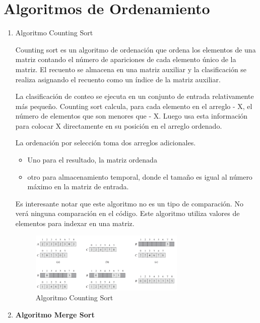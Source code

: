 \documentclass{article}
\begin{document}
	\section{Algoritmos de Ordenamiento}\label{sec:ejercicios}
	\begin{enumerate}
		\item Algoritmo Counting Sort
		
			Counting sort es un algoritmo de ordenación que ordena los elementos de una matriz contando el número de apariciones de cada elemento único de la matriz. El recuento se almacena en una matriz auxiliar y la clasificación se realiza asignando el recuento como un índice de la matriz auxiliar.
			
La clasificación de conteo se ejecuta en un conjunto de entrada relativamente más pequeño. Counting sort calcula, para cada elemento en el arreglo - X, el número de elementos que son menores que - X. Luego usa esta información para colocar X directamente en su posición en el arreglo ordenado.

La ordenación por selección toma dos arreglos adicionales.

\begin{itemize}
   \item Uno para el resultado, la matriz ordenada
   \item otro para almacenamiento temporal, donde el tamaño es   igual al número máximo en la matriz de entrada.
 \end{itemize}	
 
 Es interesante notar que este algoritmo no es un tipo de comparación. No verá ninguna comparación en el código. Este algoritmo utiliza valores de elementos para indexar en una matriz.
		
\begin{figure}[H]
\centering
\includegraphics[width=0.7\textwidth]{Imagen/CountS}
\caption{Algoritmo Counting Sort}
\label{fig:CountS}
\end{figure}



\item \textbf{Algoritmo Merge Sort}
        

\end{enumerate}
\end{document}
